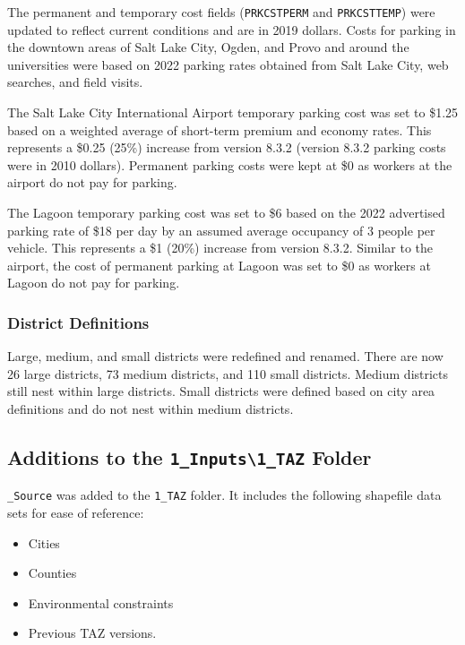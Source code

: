 \documentclass[
  letterpaper,
  DIV=11,
  numbers=noendperiod,
  titlepage=false]{scrreprt}
\providecommand{\tightlist}{%
  \setlength{\itemsep}{0pt}\setlength{\parskip}{0pt}}\usepackage{longtable,booktabs,array}
\begin{document}
The permanent and temporary cost fields (\texttt{PRKCSTPERM} and
\texttt{PRKCSTTEMP}) were updated to reflect current conditions and are
in 2019 dollars. Costs for parking in the downtown areas of Salt Lake
City, Ogden, and Provo and around the universities were based on 2022
parking rates obtained from Salt Lake City, web searches, and field
visits.

The Salt Lake City International Airport temporary parking cost was set
to \$1.25 based on a weighted average of short-term premium and economy
rates. This represents a \$0.25 (25\%) increase from version 8.3.2
(version 8.3.2 parking costs were in 2010 dollars). Permanent parking
costs were kept at \$0 as workers at the airport do not pay for parking.

The Lagoon temporary parking cost was set to \$6 based on the 2022
advertised parking rate of \$18 per day by an assumed average occupancy
of 3 people per vehicle. This represents a \$1 (20\%) increase from
version 8.3.2. Similar to the airport, the cost of permanent parking at
Lagoon was set to \$0 as workers at Lagoon do not pay for parking.

\hypertarget{district-definitions}{%
\subsubsection{District Definitions}\label{district-definitions}}

Large, medium, and small districts were redefined and renamed. There are
now 26 large districts, 73 medium districts, and 110 small districts.
Medium districts still nest within large districts. Small districts were
defined based on city area definitions and do not nest within medium
districts.

\hypertarget{additions-to-the-1_inputs1_taz-folder}{%
\subsection{\texorpdfstring{Additions to the
\texttt{1\_Inputs\textbackslash{}1\_TAZ}
Folder}{Additions to the 1\_Inputs\textbackslash1\_TAZ Folder}}\label{additions-to-the-1_inputs1_taz-folder}}

\texttt{\_Source} was added to the \texttt{1\_TAZ} folder. It includes
the following shapefile data sets for ease of reference:

\begin{itemize}
\tightlist
\item
  Cities
\item
  Counties
\item
  Environmental constraints
\item
  Previous TAZ versions.
\end{itemize}
\end{document}

